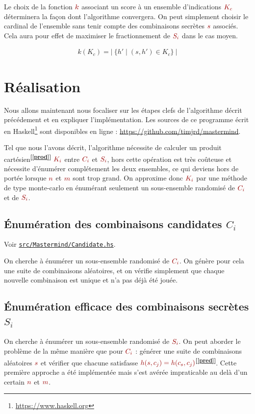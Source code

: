 \documentclass[a4paper]{article}
\renewcommand{\(}{\begin{math}\color{brick}}
\renewcommand{\)}{\end{math}}
\newcommand{\blockmath}[1]{{\color{brick}\begin{align*}#1\end{align*}}}
\renewcommand{\eqref}[1]{\color{brick}\textbf{[\ref{#1}]}}
\newcommand{\seqref}[1]{\textsuperscript{\eqref{#1}}}
\newcommand{\srcref}[1]{\href{https://github.com/timjrd/mastermind/blob/master/#1}{\texttt{#1}}}
\begin{document}
Le choix de la fonction \(k\) associant un score à un ensemble d'indications \(K_c\) déterminera la façon dont l'algorithme convergera. On peut simplement choisir le cardinal de l'ensemble sans tenir compte des combinaisons secrètes \(s\) associés. Cela aura pour effet de maximiser le fractionnement de \(S_i\) dans le cas moyen.

\blockmath{
  k(K_c) = | \ \{ h' \mid (s,h') \in K_c\} \ |
}


\section{Réalisation}
\label{random}

Nous allons maintenant nous focaliser sur les étapes clefs de l'algorithme décrit précédement et en expliquer l'implémentation. Les sources de ce programme écrit en Haskell\footnote{\url{https://www.haskell.org}} sont disponibles en ligne : \url{https://github.com/timjrd/mastermind}.

Tel que nous l'avons décrit, l'algorithme nécessite de calculer un produit cartésien\seqref{prod} \(K_i\) entre \(C_i\) et \(S_i\), hors cette opération est très coûteuse et nécessite d'énumérer complétement les deux ensembles, ce qui deviens hors de portée lorsque \(n\) et \(m\) sont trop grand. On approxime donc \(K_i\) par une méthode de type monte-carlo en énumérant seulement un sous-ensemble randomisé de \(C_i\) et de \(S_i\).

\subsection{Énumération des combinaisons candidates $ C_i $}

Voir \srcref{src/Mastermind/Candidate.hs}.

On cherche à énumérer un sous-ensemble randomisé de \(C_i\). On génère pour cela une suite de combinaisons aléatoires, et on vérifie simplement que chaque nouvelle combinaison est unique et n'a pas déjà été jouée.

\subsection{Énumération efficace des combinaisons secrètes $ S_i $}

On cherche à énumérer un sous-ensemble randomisé de \(S_i\). On peut aborder le problème de la même manière que pour \(C_i\) : générer une suite de combinaisons aléatoires \(s\) et vérifier que chacune satisfasse \(h(s,c_j) = h(c_s,c_j)\)\seqref{pred}. Cette première approche a été implémentée mais s'est avérée impraticable au delà d'un certain \(n\) et \(m\).
\end{document}
